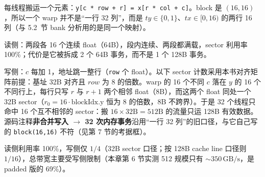 每线程搬运一个元素：\texttt{y[c * row + r] = x[r * col + c]}。block 是 $(16,16)$，所以一个 warp 并不是“一行 32 列”，而是 $ty\in\{0,1\}$、$tx\in[0,16)$ 的两行 16 列（与 5.2~节 bank 分析用的是同一个映射）。

读侧：两段各 16 个连续 float（64B），段内连续、两段都满载，sector 利用率 100\%；代价是它被拆成 2 个 64B 事务，而不是 1 个 128B 事务。

写侧：$c$ 每加 1，地址跳一整行（\texttt{row} 个 float）。以下 sector 计数采用本书对齐矩阵前提：基址 32B 对齐且 $row$ 为 8 的倍数。warp 的 16 个不同 $c$ 落在 $y$ 的 16 个不同行上，每行只写 $r$ 与 $r{+}1$ 两个相邻 float（8B），而这两个 float 同处一个 32B sector（$r_0 = 16\cdot\text{blockIdx.y}$ 恒为 8 的倍数，8B 不跨界）。于是 32 个线程只命中 16 个互不相邻的 sector：搬 $16 \times 32\mathrm{B} = 512\mathrm{B}$ 的流量只运 128B 有效数据。源码注释\textbf{非合并写入 $\to$ 32 次内存事务}沿用“一行 32 列”的旧口径，与它自己写的 \texttt{block(16,16)} 不符（见第 7 节的考据框）。

读侧利用率 100\%，写侧仅 $1/4$（32B sector 口径；按 128B cache line 口径则 $1/16$），总带宽主要受写侧限制（本章第 6 节实测 512 规模只有 $\sim 350\,\mathrm{GB/s}$，是 padded 版的 69\%）。

